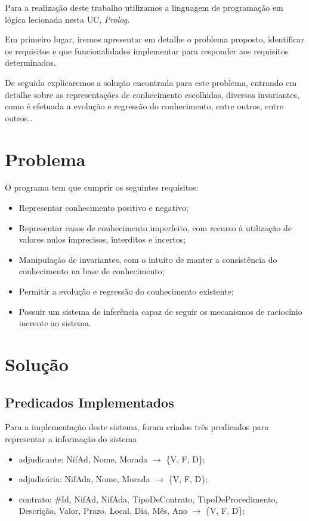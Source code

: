 \documentclass[a4paper]{report}
\begin{document}
Para a realização deste trabalho utilizamos a linguagem de programação em lógica
lecionada nesta UC, \textit{Prolog}.

Em primeiro lugar, iremos apresentar em detalhe o problema proposto, identificar
os requisitos e que funcionalidades implementar para responder aos requisitos
determinados.

De seguida explicaremos a solução encontrada para este problema, entrando em
detalhe sobre as representações de conhecimento escolhidas, diversos
invariantes, como é efetuada a evolução e regressão do conhecimento, entre
outros, entre outros..

\chapter{Problema}

O programa tem que cumprir os seguintes requisitos:
\begin{itemize}
        \item Representar conhecimento positivo e negativo;
        \item Representar casos de conhecimento imperfeito, com recurso à
            utilização de valores nulos imprecisos, interditos e incertos;
        \item Manipulação de invariantes, com o intuito de manter a consistência
            do conhecimento na base de conhecimento;
        \item Permitir a evolução e regressão do conhecimento existente;
        \item Possuir um sistema de inferência capaz de seguir os mecanismos de
            raciocínio inerente ao sistema.
\end{itemize}

\chapter{Solução}

\section{Predicados Implementados}

Para a implementação deste sistema, foram criados três predicados para
representar a informação do sistema
\begin{itemize}
    \item adjudicante: NifAd, Nome, Morada $\rightarrow$ \{V, F, D\};
    \item adjudicária: NifAda, Nome, Morada $\rightarrow$ \{V, F, D\};
    \item contrato: \#Id, NifAd, NifAda, TipoDeContrato,
        TipoDeProcedimento, Descrição, Valor, Prazo, Local, Dia, Mês, Ano 
        $\rightarrow$ \{V, F, D\};
\end{itemize}
\end{document}
